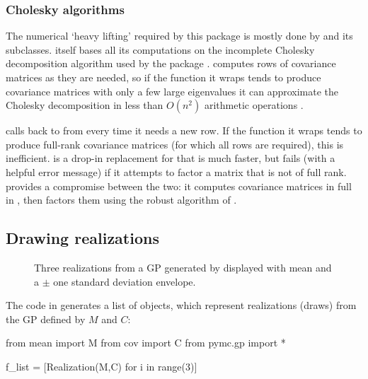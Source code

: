 \documentclass[article]{jss}
\begin{document}
\subsubsection{Cholesky algorithms}

The numerical `heavy lifting' required by this package is mostly done by  and its subclasses.  itself bases all its computations on the incomplete Cholesky decomposition algorithm used by the  package  \citep{seeger}.  computes rows of covariance matrices as they are needed, so if the function it wraps tends to produce covariance matrices with only a few large eigenvalues it can approximate the Cholesky decomposition in less than $O(n^2)$ arithmetic operations \citep{predictivechol}.

 calls back to  from  every time it needs a new row. If the function it wraps tends to produce full-rank covariance matrices (for which all rows are required), this is inefficient.  is a drop-in replacement for  that is much faster, but fails (with a helpful error message) if it attempts to factor a matrix that is not of full rank.  provides a compromise between the two: it computes covariance matrices in full in , then factors them using the robust algorithm of .

\subsection{Drawing realizations}\label{subsub:realizations}
\begin{figure}
    \centering
    \caption{Three realizations from a GP generated by  displayed with mean and a $\pm$ one standard deviation envelope.}
    \label{fig:realizations}
\end{figure}

The code in  generates a list of  objects, which represent realizations (draws) from the GP defined by $M$ and $C$:
\begin{CodeChunk}
\begin{CodeInput}
from mean import M
from cov import C
from pymc.gp import *

f_list = [Realization(M,C) for i in range(3)]
\end{CodeInput}
\end{CodeChunk}
\end{document}
